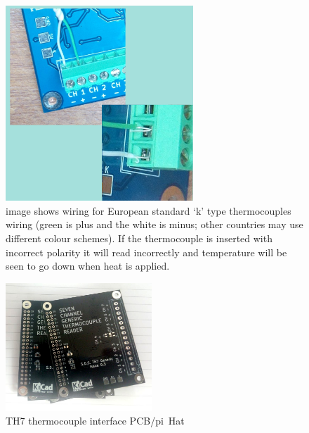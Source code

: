 \documentclass[10pt,foldmark]{leaflet}
\begin{document}
\begin{figure}[h]
 \centering
 \includegraphics[width=200pt]{./wiring.jpg}
 \caption{image shows wiring for European standard `k' type thermocouples wiring (green is plus and the white is minus; other countries may use different colour schemes). 
%
 If the thermocouple is inserted with incorrect polarity it will read incorrectly and temperature will be seen to go down when heat is applied.}
 \label{fig:con}
\end{figure}

\begin{figure}[h]
 \centering
 \includegraphics[width=156pt]{./TH7_0p3.jpg}
 \caption{TH7 thermocouple interface PCB/pi~Hat}
 \label{fig:th7_2}
\end{figure}
\end{document}
